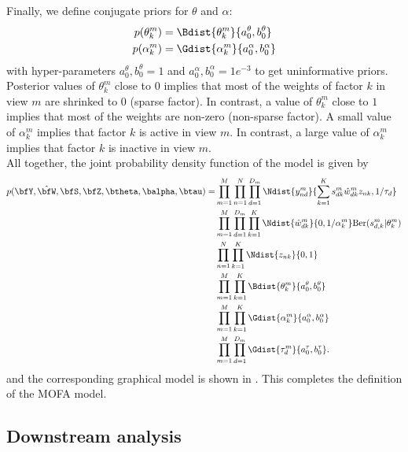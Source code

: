 Finally, we define conjugate priors for $\theta$ and $\alpha$:
\begin{align}
	p(\theta_k^m) &= \Bdist{\theta_k^m}{a_0^\theta,b_0^\theta}\\
	p(\alpha_k^m) &= \Gdist{\alpha_k^m}{a_0^\alpha, b_0^\alpha}
\end{align}
with hyper-parameters $a_0^\theta,b_0^\theta =1$ and $a_0^\alpha, b_0^\alpha=1e^{-3}$ to get uninformative priors.\\
Posterior values of $\theta_k^m$ close to $0$ implies that most of the weights of factor $k$ in view $m$ are shrinked to $0$ (sparse factor). In contrast, a value of $\theta_k^m$ close to $1$ implies that most of the weights are non-zero (non-sparse factor). A small value of $\alpha_k^m$ implies that factor $k$ is active in view $m$. In contrast, a large value of $\alpha_k^m$ implies that factor $k$ is inactive in view $m$.\\

All together, the joint probability density function of the model is given by
\begin{align}
	\begin{split}
	p(\bfY,\hat{\bfW},\bfS,\bfZ,\btheta, \balpha, \btau)  = &\prod_{m=1}^{M} \prod_{n=1}^{N} \prod_{d=1}^{D_m} \Ndist{y_{nd}^m}{\sum_{k=1}^{K} s_{dk}^m \hat{w}_{dk}^m z_{nk},1/\tau_d} \\
	& \prod_{m=1}^{M}\prod_{d=1}^{D_m} \prod_{k=1}^{K} \Ndist{\hat{w}_{dk}^m}{0,1/\alpha_k^m} \text{Ber}(s_{d,k}^m|\theta_k^m) \\
	& \prod_{n=1}^{N} \prod_{k=1}^{K} \Ndist{z_{nk}}{0,1} \\
	& \prod_{m=1}^{M} \prod_{k=1}^{K} \Bdist{\theta_k^m}{a_0^\theta,b_0^\theta}\\
	& \prod_{m=1}^{M} \prod_{k=1}^{K} \Gdist{\alpha_k^m}{a_0^\alpha, b_0^\alpha}\\
	& \prod_{m=1}^{M} \prod_{d=1}^{D_m} \Gdist{\tau_d^m}{a_0^\tau,b_0^\tau}.
	\label{likelihood}
	\end{split}
\end{align}
and the corresponding graphical model is shown in . This completes the definition of the MOFA model.

\subsection{Downstream analysis} \label{mofa:downstream}

